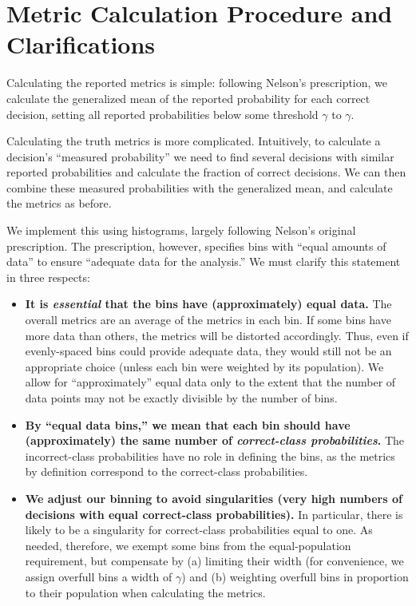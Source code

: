 \documentclass{spie}
\begin{document}
\section{Metric Calculation Procedure and Clarifications}
\label{proc}

Calculating the reported metrics is simple: following Nelson's prescription, we calculate the generalized mean of the reported probability for each correct decision, setting all reported probabilities below some threshold $\gamma$ to $\gamma$.

Calculating the truth metrics is more complicated. Intuitively, to calculate a decision's ``measured probability'' we need to find several decisions with similar reported probabilities and calculate the fraction of correct decisions. We can then combine these measured probabilities with the generalized mean, and calculate the metrics as before. 

We implement this using histograms, largely following Nelson's original prescription. The prescription, however, specifies bins with ``equal amounts of data'' to ensure ``adequate data for the analysis.'' We must clarify this statement in three respects:
\begin{itemize}
\item \textbf{It is \textit{essential} that the bins have (approximately) equal data.} The overall metrics are an average of the metrics in each bin. If some bins have more data than others, the metrics will be distorted accordingly. Thus, even if evenly-spaced bins could provide adequate data, they would still not be an appropriate choice (unless each bin were weighted by its population). We allow for ``approximately'' equal data only to the extent that the number of data points may not be exactly divisible by the number of bins.
\item \textbf{By ``equal data bins,'' we mean that each bin should have (approximately) the same number of \textit{correct-class probabilities}.} The incorrect-class probabilities have no role in defining the bins, as the metrics by definition correspond to the correct-class probabilities. 
\item \textbf{We adjust our binning to avoid singularities (very high numbers of decisions with equal correct-class probabilities).} In particular, there is likely to be a singularity for correct-class probabilities equal to one. As needed, therefore, we exempt some bins from the equal-population requirement, but compensate by (a) limiting their width (for convenience, we assign overfull bins a width of $\gamma$) and (b) weighting overfull bins in proportion to their population when calculating the metrics. 
\end{itemize}
\end{document}
